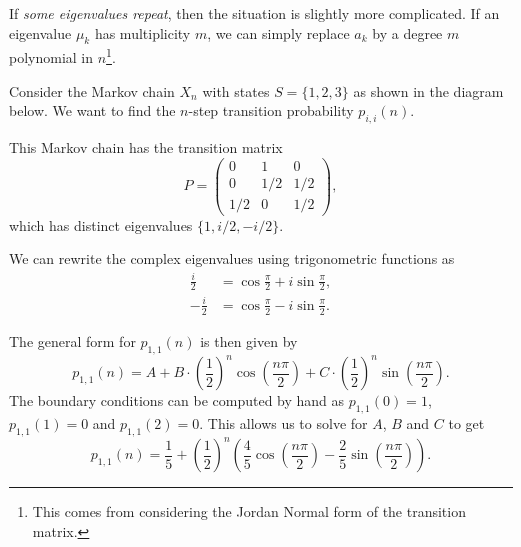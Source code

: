 If \emph{some eigenvalues repeat}, then the situation is slightly more complicated. If an eigenvalue $\mu_k$ has multiplicity $m$, we can simply replace $a_k$ by a degree $m$ polynomial in $n$\footnote{This comes from considering the Jordan Normal form of the transition matrix.}. 


\begin{example}
	Consider the Markov chain $X_n$ with states $S = \{1, 2, 3\}$ as shown in the diagram below. We want to find the $n$-step transition probability $p_{i, i}(n)$.
	\begin{center}
	\end{center}

	This Markov chain has the transition matrix
	$$
	P = \begin{pmatrix}
		0 & 1 & 0 \\
		0 & 1/2 & 1/2 \\ 
		1/2 & 0 & 1/2
	\end{pmatrix},
	$$
	which has distinct eigenvalues $\{1, i/2, -i/2\}$.

	We can rewrite the complex eigenvalues using trigonometric functions as
	\begin{align*}
		\frac{i}{2} &= \cos \frac{\pi}{2} + i \sin \frac{\pi}{2}, \\ 
		-\frac{i}{2} &= \cos \frac{\pi}{2} - i \sin \frac{\pi}{2}.
	\end{align*}

	The general form for $p_{1,1}(n)$ is then given by
	$$
	p_{1,1}(n) = A + B \cdot \left(\frac{1}{2}\right)^n \cos \left(\frac{n \pi}{2}\right) + C \cdot \left(\frac{1}{2}\right)^n \sin\left(\frac{n \pi}{2}\right).
	$$
	The boundary conditions can be computed by hand as
	$p_{1,1}(0) = 1$, $p_{1,1}(1) = 0$ and $p_{1,1}(2) = 0$. This allows us to solve for $A$, $B$ and $C$ to get
	$$
	p_{1,1}(n) = \frac{1}{5} + \left(\frac{1}{2}\right)^n \left(\frac{4}{5}\cos\left(\frac{n \pi}{2}\right) - \frac{2}{5} \sin \left(\frac{n \pi}{2}\right)\right).
	$$
\end{example}

